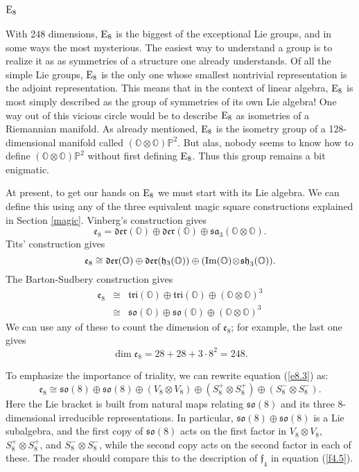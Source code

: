 \documentclass[12pt]{article}
\renewcommand\O{{\mathbb O}}
\renewcommand\P{{\mathbb P}}
\newcommand{\E}{{\rm E}}
\newcommand{\so}{{\mathfrak {so}}}
\newcommand{\e}{{\mathfrak {e}}}
\newcommand{\f}{{\mathfrak {f}}}
\newcommand{\sa}{{\mathfrak {sa}}}
\newcommand{\h}{{\mathfrak {h}}}
\newcommand{\sh}{{\mathfrak {sh}}}
\newcommand{\Der}{{\mathfrak {der}}}
\newcommand{\Tri}{{\mathfrak {tri}}}
\renewcommand{\Im}{{\rm Im}}
\newcommand{\tensor}{\otimes}
\newcommand{\iso}{\cong}
\newcommand{\be}{\begin{equation}}
\newcommand{\ee}{\end{equation}}
\begin{document}
\subsection{$\E_8$}   \label{E8}   
   
With 248 dimensions, $\E_8$ is the biggest of the exceptional Lie
groups, and in some ways the most mysterious.  The easiest way to
understand a group is to realize it as as symmetries of a structure one
already understands.  Of all the simple Lie groups, $\E_8$ is the only
one whose smallest nontrivial representation is the adjoint
representation.  This means that in the context of linear algebra,
$\E_8$ is most simply described as the group of symmetries of its own
Lie algebra!  One way out of this vicious circle would be to describe
$\E_8$ as isometries of a Riemannian manifold.  As already mentioned,
$\E_8$ is the isometry group of a 128-dimensional manifold called $(\O
\tensor \O)\P^2$.  But alas, nobody seems to know how to define $(\O
\tensor \O)\P^2$ without first defining $\E_8$.  Thus this group remains
a bit enigmatic.

At present, to get our hands on $\E_8$ we must start with its Lie
algebra.   We can define this using any of the three equivalent magic
square constructions explained in Section \ref{magic}.  Vinberg's
construction gives
\[
\e_8 = \Der(\O) \oplus \Der(\O) \oplus \sa_3(\O \tensor \O)  .
\label{e8.1}
\]
Tits' construction gives
\[
\e_8 \iso \Der(\O) \oplus \Der(\h_3(\O)) \oplus    
(\Im(\O) \!\tensor \! \sh_3(\O)) .
\label{e8.2}
\]
The Barton-Sudbery construction gives
\be
\begin{array}{lcl}
 \e_8 &\iso& \Tri(\O) \oplus \Tri(\O) \oplus (\O \tensor \O)^3 \\
      &\iso& \so(\O) \oplus \so(\O) \oplus (\O \tensor \O)^3 
\end{array}
\label{e8.3}
\ee
We can use any of these to count the dimension of $\e_8$; for example,
the last one gives
\[   \dim \e_8 = 28 + 28 + 3 \cdot 8^2 = 248.\]   

To emphasize the importance of triality, we can rewrite equation 
(\ref{e8.3}) as:
\be
\e_8  \iso \so(8) \oplus \so(8) \oplus (V_8 \tensor V_8) \oplus
             (S_8^+ \tensor S_8^+) \oplus (S_8^- \tensor S_8^-).
\label{e8.4}
\ee
Here the Lie bracket is built from natural maps relating $\so(8)$
and its three 8-dimensional irreducible representations.  In particular,
$\so(8) \oplus \so(8)$ is a Lie subalgebra, and the first copy of
$\so(8)$ acts on the first factor in $V_8 \tensor V_8$, $S_8^+ \tensor
S_8^+$, and $S_8^- \tensor S_8^-$, while the second copy acts on the
second factor in each of these.   The reader should compare this to
the description of $\f_4$ in equation (\ref{f4.5}).
\end{document}
